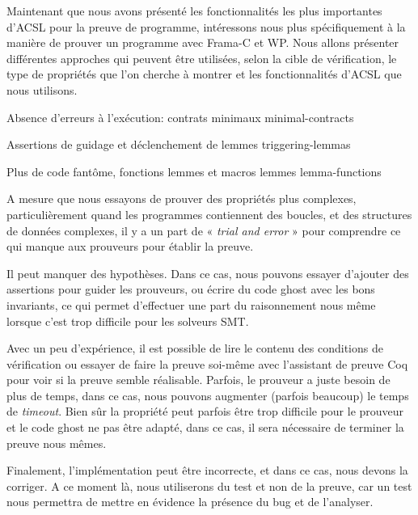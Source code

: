 Maintenant que  nous avons présenté les fonctionnalités les plus importantes
d'ACSL pour la preuve de programme, intéressons nous plus spécifiquement à la
manière de prouver un programme avec Frama-C et WP. Nous allons présenter
différentes approches qui peuvent être utilisées, selon la cible de vérification,
le type de propriétés que l'on cherche à montrer et les fonctionnalités d'ACSL
que nous utilisons.


\begin{levelTwo}
  {Absence d'erreurs à l'exécution: contrats minimaux}
  {minimal-contracts}
\end{levelTwo}

\begin{levelTwo}
  {Assertions de guidage et déclenchement de lemmes}
  {triggering-lemmas}
\end{levelTwo}

\begin{levelTwo}
  {Plus de code fantôme, fonctions lemmes et macros lemmes}
  {lemma-functions}
\end{levelTwo}



\horizontalLine
\newpage


A mesure que nous essayons de prouver des propriétés plus complexes,
particulièrement quand les programmes contiennent des boucles, et des
structures de données complexes, il y a un part de « \textit{trial and error} »
pour comprendre ce qui manque aux prouveurs pour établir la preuve.


Il peut manquer des hypothèses. Dans ce cas, nous pouvons essayer d'ajouter
des assertions pour guider les prouveurs, ou écrire du code ghost avec les
bons invariants, ce qui permet d'effectuer une part du raisonnement nous
même lorsque c'est trop difficile pour les solveurs SMT.


Avec un peu d'expérience, il est possible de lire le contenu des
conditions de vérification ou essayer de faire la preuve soi-même avec
l'assistant de preuve Coq pour voir si la preuve semble réalisable.
Parfois, le prouveur a juste besoin de plus de temps, dans ce cas, nous
pouvons augmenter (parfois beaucoup) le temps de \textit{timeout}. Bien
sûr la propriété peut parfois être trop difficile pour le prouveur et
le code ghost ne pas être adapté, dans ce cas, il sera nécessaire de
terminer la preuve nous mêmes.


Finalement, l'implémentation peut être incorrecte, et dans ce cas,
nous devons la corriger. A ce moment là, nous utiliserons du test et
non de la preuve, car un test nous permettra de mettre en évidence la
présence du bug et de l'analyser.
